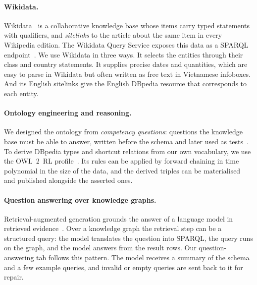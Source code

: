 \paragraph{Wikidata.} Wikidata~\cite{vrandecic2014wikidata} is a collaborative
knowledge base whose items carry typed statements with qualifiers, and
\emph{sitelinks} to the article about the same item in every Wikipedia
edition. The Wikidata Query Service exposes this data as a SPARQL
endpoint~\cite{malyshev2018wdqs}. We use Wikidata in three ways. It selects the
entities through their class and country statements. It supplies precise
dates and quantities, which are easy to parse in Wikidata but often written as
free text in Vietnamese infoboxes. And its English sitelinks give the
English DBpedia resource that corresponds to each entity.

\paragraph{Ontology engineering and reasoning.} We designed the ontology from
\emph{competency questions}: questions the knowledge base must be able to
answer, written before the schema and later used as
tests~\cite{gruninger1995methodology}. To derive DBpedia types and shortcut
relations from our own vocabulary, we use the OWL~2~RL
profile~\cite{motik2012owl2profiles}. Its rules can be applied by forward
chaining in time polynomial in the size of the data, and the derived triples
can be materialised and published alongside the asserted ones.

\paragraph{Question answering over knowledge graphs.} Retrieval-augmented
generation grounds the answer of a language model in retrieved
evidence~\cite{lewis2020rag}. Over a knowledge graph the retrieval step can be
a structured query: the model translates the question into SPARQL, the query
runs on the graph, and the model answers from the result rows. Our
question-answering tab follows this pattern. The model receives a summary of
the schema and a few example queries, and invalid or empty queries are sent
back to it for repair.
